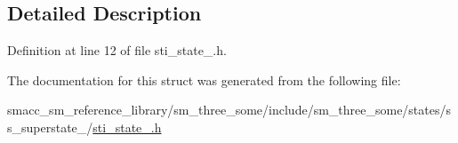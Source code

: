 \subsection{Detailed Description}


Definition at line 12 of file sti\+\_\+state\+\_.\+h.



The documentation for this struct was generated from the following file\+:\begin{DoxyCompactItemize}
\item 
smacc\+\_\+sm\+\_\+reference\+\_\+library/sm\+\_\+three\+\_\+some/include/sm\+\_\+three\+\_\+some/states/ss\+\_\+superstate\+\_/\hyperlink{sti__state__2_8h}{sti\+\_\+state\+\_.\+h}\end{DoxyCompactItemize}
